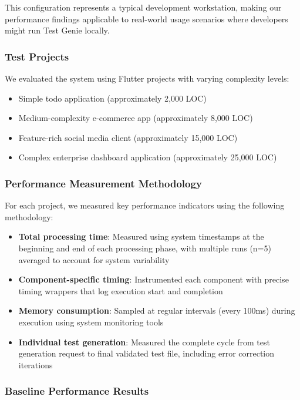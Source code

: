 This configuration represents a typical development workstation, making our performance findings applicable to real-world usage scenarios where developers might run Test Genie locally.

\subsubsection{Test Projects}

We evaluated the system using Flutter projects with varying complexity levels:

\begin{itemize}
    \item Simple todo application (approximately 2,000 LOC)
    \item Medium-complexity e-commerce app (approximately 8,000 LOC)
    \item Feature-rich social media client (approximately 15,000 LOC)
    \item Complex enterprise dashboard application (approximately 25,000 LOC)
\end{itemize}

\subsubsection{Performance Measurement Methodology}

For each project, we measured key performance indicators using the following methodology:
\begin{itemize}
    \item \textbf{Total processing time}: Measured using system timestamps at the beginning and end of each processing phase, with multiple runs (n=5) averaged to account for system variability
    
    \item \textbf{Component-specific timing}: Instrumented each component with precise timing wrappers that log execution start and completion
    
    \item \textbf{Memory consumption}: Sampled at regular intervals (every 100ms) during execution using system monitoring tools
    
    \item \textbf{Individual test generation}: Measured the complete cycle from test generation request to final validated test file, including error correction iterations
\end{itemize}

\subsubsection{Baseline Performance Results}

